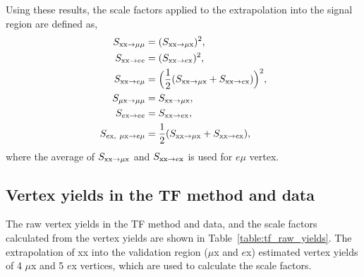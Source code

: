 Using these results, the scale factors applied to the extrapolation into the signal region are defined as,
\begin{align}
\label{eq:TF_scale_factors}
S_{\mathrm{xx}\rightarrow \mu\mu}  &=  (S_{\mathrm{xx}\rightarrow \mu \mathrm{x}} )^{2},  \nonumber\\
S_{\mathrm{xx}\rightarrow ee}  &= (S_{\mathrm{xx}\rightarrow e \mathrm{x}} )^{2},  \nonumber\\
S_{\mathrm{xx}\rightarrow e\mu}  &= \Big(\frac{1}{2} (S_{\mathrm{xx}\rightarrow \mu \mathrm{x}}  + S_{\mathrm{xx}\rightarrow e \mathrm{x}} )\Big)^{2}, \nonumber\\
S_{\mu \mathrm{x}\rightarrow \mu\mu}  &=  S_{\mathrm{xx}\rightarrow \mu \mathrm{x}} ,  \nonumber\\
S_{e \mathrm{x}\rightarrow ee}  &= S_{\mathrm{xx}\rightarrow e \mathrm{x}} ,  \nonumber\\
S_{e \mathrm{x},~\mu \mathrm{x} \rightarrow e\mu}  &= \frac{1}{2} (S_{\mathrm{xx}\rightarrow \mu \mathrm{x}}  + S_{\mathrm{xx}\rightarrow e \mathrm{x}} ),
\end{align}
where the average of $S_{\mathrm{xx}\rightarrow \mu \mathrm{x}} $ and $S_{\mathrm{xx}\rightarrow e \mathrm{x}} $ is used for $e \mu$ vertex.



\subsection{Vertex yields in the TF method and data}
\label{sec:tf_raw_yields}
The raw vertex yields in the TF method and data, and the scale factors calculated from the vertex yields are shown in Table~\ref{table:tf_raw_yields}. The extrapolation of xx into the validation region ($\mu$x and $e$x) estimated vertex yields of 4 $\mu$x and 5 $e$x vertices, which are used to calculate the scale factors.

\begin{table}[!htb]%
  \centering
  \qquad
  \caption{(a) Vertex yields in the TF and data. (b) The scale factors calculated from the vetex yields}
  \label{table:tf_raw_yields}
\end{table}


